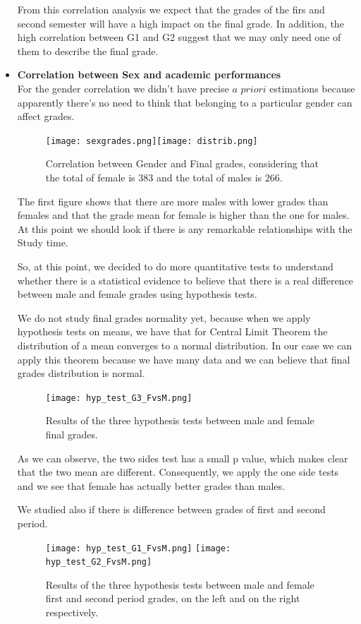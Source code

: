 \documentclass[a4paper, 11pt]{article}
\theoremstyle{definition}
\numberwithin{equation}{section}		%
\numberwithin{table}{section}				%
\begin{document}
\begin{itemize}
From this correlation analysis we expect that the grades of the firs and second semester will have a high impact on the final grade. In addition, the high correlation between G1 and G2 suggest that we may only need one of them to describe the final grade.
\item \textbf{Correlation between Sex and academic performances}
\\For the gender correlation we didn't have precise $a$ $priori$ estimations because apparently there's no need to think that belonging to a particular gender can affect grades.

\begin{figure}[h]\centering
\texttt{[image: sexgrades.png]}\quad\texttt{[image: distrib.png]}
\caption{Correlation between Gender and Final grades, considering that the total of female is $383$ and the total of males is $266$.}
\end{figure}

The first figure shows that there are more males with lower grades than females and that the grade mean for female is higher than the one for males. At this point we should look if there is any remarkable relationships with the Study time.

So, at this point, we decided to do more quantitative tests to understand
whether there is a statistical evidence to believe that there is a real 
difference between male and female grades using hypothesis tests.

We do not study final grades normality yet, because when we apply hypothesis
tests on means, we have that for Central Limit Theorem the distribution of
a mean converges to a normal distribution. In our case we can apply this theorem because we have many data and we can believe that final grades 
distribution is normal.

\begin{figure}[h]\centering
\texttt{[image: hyp\_test\_G3\_FvsM.png]}
\caption{Results of the three hypothesis tests between male and female final grades.}
\end{figure}

As we can observe, the two sides test has a small p value, which makes clear
that the two mean are different. Consequently, we apply the one side tests 
and we see that female has actually better grades than males.

We studied also if there is difference between grades of first and second period.

\begin{figure}[h]\centering
\texttt{[image: hyp\_test\_G1\_FvsM.png]}
\texttt{[image: hyp\_test\_G2\_FvsM.png]}
\caption{Results of the three hypothesis tests between male and female first and second period grades, on the left and on the right respectively.}
\end{figure}


\end{itemize}
\end{document}
